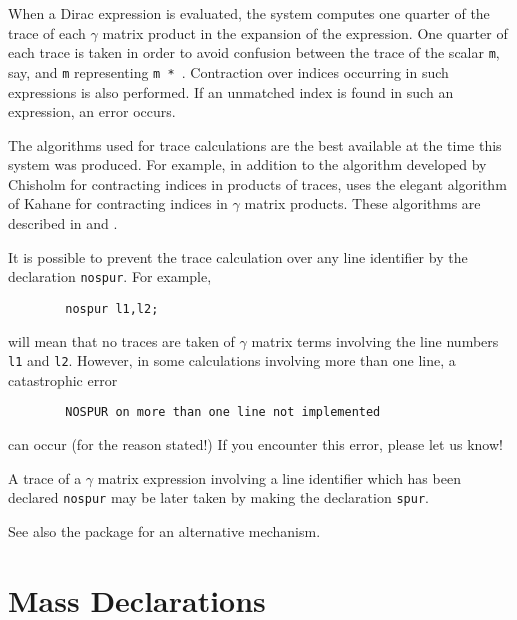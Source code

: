 When a Dirac expression is evaluated, the system computes one quarter of
the trace of each $\gamma$ matrix product in the expansion of the expression.
One quarter of each trace is taken in order to avoid confusion between the
trace of the scalar \texttt{m}, say, and \texttt{m} representing
\texttt{m * }.  
Contraction over indices occurring in such expressions is
also performed.  If an unmatched index is found in such an expression, an
error occurs.

The algorithms used for trace calculations are the best available at the
time this system was produced. For example, in addition to the algorithm
developed by Chisholm for contracting indices in products of traces,
{\REDUCE} uses the elegant algorithm of Kahane for contracting indices in
$\gamma$ matrix products.  These algorithms are described in \cite{Chisholm1963}
and \cite{Kahane:1968}.

It is possible to prevent the trace calculation over any line identifier
by the declaration \texttt{nospur}.  For example,
\begin{verbatim}
        nospur l1,l2;
\end{verbatim}
will mean that no traces are taken of $\gamma$ matrix terms involving the line
numbers \texttt{l1} and \texttt{l2}.  However, in some calculations involving
more than one line, a catastrophic error
\begin{verbatim}
        NOSPUR on more than one line not implemented
\end{verbatim}
can occur (for the reason stated!) If you encounter this error, please let
us know!

A trace of a $\gamma$ matrix expression involving a line identifier which has
been declared \texttt{nospur} may be later taken by making the declaration
\texttt{spur}.

See also the  package for an alternative
mechanism.

\section{Mass Declarations}
\hypertarget{command:MASS}{}
\hypertarget{command:MSHELL}{}

